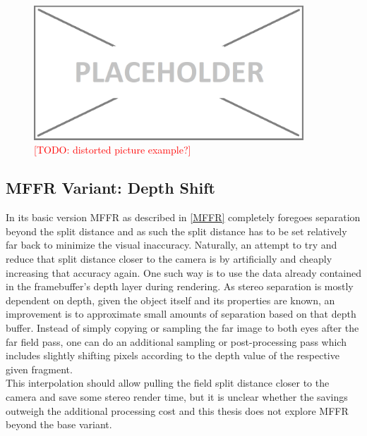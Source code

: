 \begin{figure}[h!]
  \centering
  \includegraphics[width=0.9\textwidth]{pictures/placeholder}
  \caption{\textcolor{red}{[TODO: distorted picture example?]}} \label{fig:distortion_MFFR}
\end{figure}

\subsection{\gls{MFFR} Variant: Depth Shift}  \label{MFFR_depthshift}
In its basic version \gls{MFFR} as described in \autoref{MFFR} completely foregoes separation beyond the split distance and as such the split distance has to be set relatively far back to minimize the visual inaccuracy. Naturally, an attempt to try and reduce that split distance closer to the camera is by artificially and cheaply increasing that accuracy again. One such way is to use the data already contained in the framebuffer's depth layer during rendering. As stereo separation is mostly dependent on depth, given the object itself and its properties are known, an improvement is to approximate small amounts of separation based on that depth buffer. Instead of simply copying or sampling the far image to both eyes after the far field pass, one can do an additional sampling or post-processing pass which includes slightly shifting pixels according to the depth value of the respective given fragment. \\
This interpolation should allow pulling the field split distance closer to the camera and save some stereo render time, but it is unclear whether the savings outweigh the additional processing cost and this thesis does not explore \gls{MFFR} beyond the base variant. 

